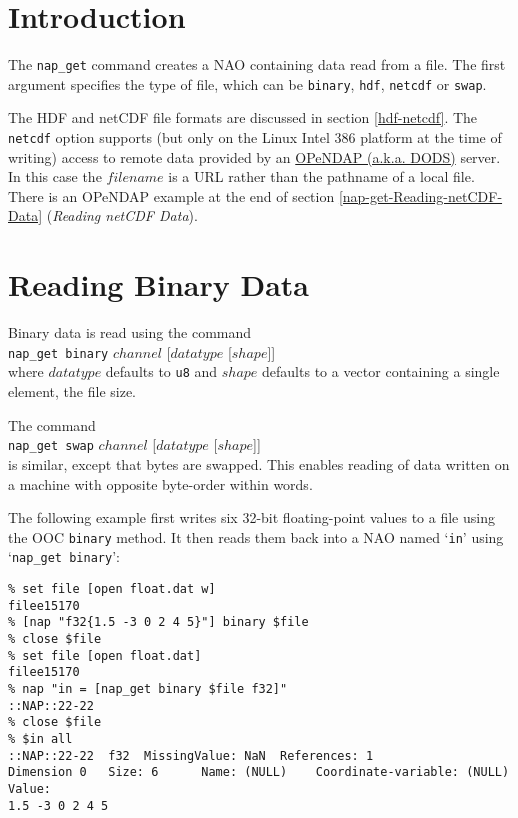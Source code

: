 
\label{nap-get}

\section{Introduction}
    \label{nap-get-Introduction}

The 
  \texttt{nap\_get} command creates a NAO containing data read from
  a file. The first argument specifies the type of file, which can be 
  \texttt{binary}, 
  \texttt{hdf}, 
  \texttt{netcdf} or 
  \texttt{swap}.

The HDF and netCDF file formats are discussed in section \ref{hdf-netcdf}.
The \texttt{netcdf} option supports (but only on the Linux Intel
  386 platform at the time of writing) access to remote data provided
  by an 
  \href{http://www.opendap.org/}{OPeNDAP (a.k.a. DODS)} server.
  In this case the 
  $\mathit{filename}$ is a URL rather than the pathname of a local
  file. There is an OPeNDAP example at the end of 
  section \ref{nap-get-Reading-netCDF-Data} (\emph{Reading netCDF Data}).

\section{Reading Binary Data}
    \label{nap-get-Reading-Binary-Data}

Binary data is read using the command
\\
\texttt{nap\_get binary} $\mathit{channel}$ [$\mathit{datatype}$ [$\mathit{shape}$]]
\\
where 
  $\mathit{datatype}$ defaults to 
  \texttt{u8} and 
  $\mathit{shape}$ defaults to a vector containing a single element, the file size.

The command
\\
\texttt{nap\_get swap} $\mathit{channel}$ [$\mathit{datatype}$ [$\mathit{shape}$]]
\\
is similar, except that bytes are swapped.
This enables reading of data written on a machine with opposite byte-order within words.

The following example first writes six 32-bit floating-point
  values to a file using the OOC 
  \texttt{binary} method. It then reads them back into a NAO named
  `\texttt{in}' using `\texttt{nap\_get binary}':
  \begin{verbatim}
% set file [open float.dat w]
filee15170
% [nap "f32{1.5 -3 0 2 4 5}"] binary $file
% close $file
% set file [open float.dat]
filee15170
% nap "in = [nap_get binary $file f32]"
::NAP::22-22
% close $file
% $in all
::NAP::22-22  f32  MissingValue: NaN  References: 1
Dimension 0   Size: 6      Name: (NULL)    Coordinate-variable: (NULL)
Value:
1.5 -3 0 2 4 5
\end{verbatim}

